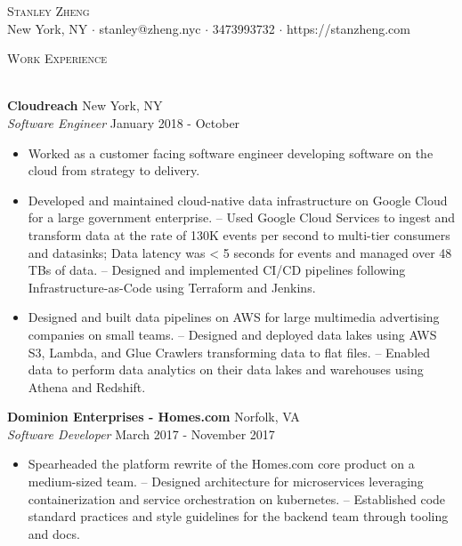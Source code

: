 \documentclass[a4paper]{article}
\newcommand{\lineunder} {
    \vspace*{-8pt} \\
    \hspace*{-18pt} \hrulefill \\
}
\newcommand{\header} [1] {
    {\hspace*{-18pt}\vspace*{6pt} \textsc{#1}}
    \vspace*{-6pt} \lineunder
}
\begin{document}
\vspace*{-40pt}

    

\vspace*{-10pt}
\begin{center}
	{\Huge \scshape {Stanley Zheng}}\\
	New York, NY $\cdot$ stanley@zheng.nyc $\cdot$ 3473993732 $\cdot$ https://stanzheng.com\\
\end{center}

\header{Work Experience}
\vspace{1mm}

\textbf{Cloudreach} \hfill New York, NY\\
\textit{Software Engineer} \hfill January 2018 - October\\
\vspace{-1mm}
\begin{itemize} \itemsep 1pt
	\item Worked as a customer facing software engineer developing software on the cloud from strategy to delivery.
	\item Developed and maintained cloud-native data infrastructure on Google Cloud for a large government enterprise. – Used Google Cloud Services to ingest and transform data at the rate of 130K events per second to multi-tier consumers and datasinks; Data latency was \textless{} 5 seconds for events and managed over 48 TBs of data. – Designed and implemented CI/CD pipelines following Infrastructure-as-Code using Terraform and Jenkins.
	\item Designed and built data pipelines on AWS for large multimedia advertising companies on small teams. – Designed and deployed data lakes using AWS S3, Lambda, and Glue Crawlers transforming data to flat files. – Enabled data to perform data analytics on their data lakes and warehouses using Athena and Redshift.
\end{itemize}
\textbf{Dominion Enterprises - Homes.com} \hfill Norfolk, VA\\
\textit{Software Developer} \hfill March 2017 - November 2017\\
\vspace{-1mm}
\begin{itemize} \itemsep 1pt
	\item Spearheaded the platform rewrite of the Homes.com core product on a medium-sized team. – Designed architecture for microservices leveraging containerization and service orchestration on kubernetes. – Established code standard practices and style guidelines for the backend team through tooling and docs.
\end{itemize}
\end{document}
